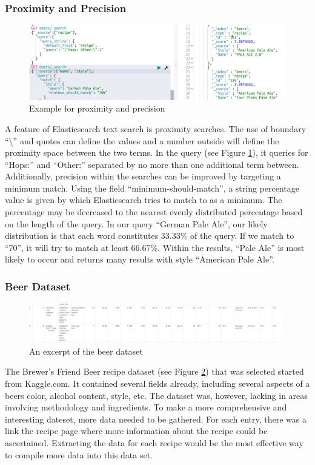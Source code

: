 \documentclass[bibliography=totoc]{article}
\begin{document}
\subsubsection{Proximity and Precision}
\begin{figure}
    \includegraphics[height=0.3\textwidth]{beer_proximity.png}
    \caption{\label{beer_proximity}Example for proximity and precision} 
 \end{figure}
 A feature of Elasticsearch text search is proximity searches. 
 The use of boundary “\textbackslash” and quotes can define the values and a 
 number outside will define the proximity space between the two 
 terms. In the query (see Figure \ref{beer_proximity}), it queries for “Hops:” and “Other:” 
 separated by no more than one additional term between. 
 Additionally, precision within the searches can be improved by 
 targeting a minimum match. Using the field “minimum-should-match”, 
 a string percentage value is given by which Elasticsearch tries to 
 match to as a minimum. The 
 percentage may be decreased to the nearest evenly distributed percentage 
 based on the length of the query. 
 In our query “German Pale Ale”, our likely distribution is 
 that each word constitutes 33.33\% of the query. 
 If we match to “70”, it will try to match at least 66.67\%. 
 Within the results, “Pale Ale” is most likely to occur and returns 
 many results with style “American Pale Ale”.

 \subsubsection{Beer Dataset}
 \begin{figure}
    \includegraphics[height=0.2\textwidth]{beer_dataset.png}
    \caption{\label{beer_dataset}An excerpt of the beer dataset} 
 \end{figure}
 The Brewer’s Friend Beer recipe dataset (see Figure \ref{beer_dataset}) that was selected started 
 from Kaggle.com. It contained several fields already, 
 including several aspects of a beers color, alcohol content, 
 style, etc. The dataset was, however, lacking in areas 
 involving methodology and ingredients. To make a more 
 comprehensive and interesting dateset, more data needed to be 
 gathered. For each entry, there was a link the recipe page where 
 more information about the recipe could be ascertained. 
 Extracting the data for each recipe would be the most effective 
 way to compile more data into this data set.
\end{document}
